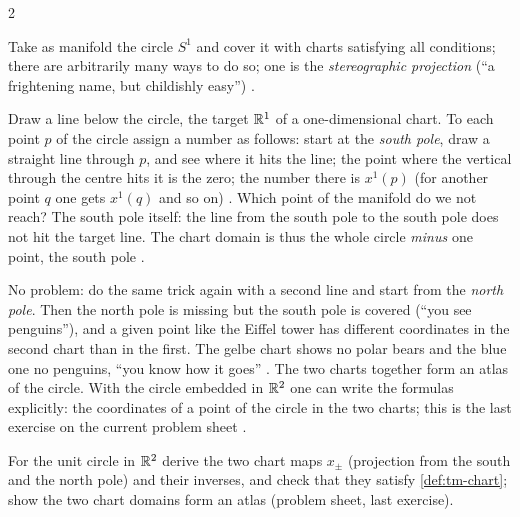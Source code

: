 \begin{paracol}{2}
\begin{example}\label{ex:tm-circle}
Take as manifold the circle $S^1$ and cover it with charts satisfying all conditions; there are arbitrarily many ways to
do so; one is the \emph{stereographic projection} (``a frightening name, but childishly easy'')
.\par
Draw a line below the circle, the target $\mathbb{R}^1$ of a one-dimensional chart. To each point $p$ of the circle assign
a number as follows: start at the \emph{south pole}, draw a straight line through $p$, and see where it hits the line; the
point where the vertical through the centre hits it is the zero; the number there is $x^1(p)$ (for another point $q$ one
gets $x^1(q)$ and so on) .
Which point of the manifold do we not reach? The south pole itself: the line from the south pole to the south pole does
not hit the target line. The chart domain is thus the whole circle \emph{minus} one point, the south pole
.\par
No problem: do the same trick again with a second line and start from the \emph{north pole}. Then the north pole is
missing but the south pole is covered (``you see penguins''), and a given point like the Eiffel tower has different
coordinates in the second chart than in the first. The gelbe chart shows no polar bears and the blue one no penguins,
``you know how it goes'' . The two charts together
form an atlas of the circle. With the circle embedded in $\mathbb{R}^2$ one can write the formulas explicitly: the coordinates of
a point of the circle in the two charts; this is the last exercise on the current problem sheet
.
\end{example}
\begin{exercise}\label{ex:tm-stereo}
For the unit circle in $\mathbb{R}^2$ derive the two chart maps $x_{\pm}$ (projection from the south and the north pole) and
their inverses, and check that they satisfy \cref{def:tm-chart}; show the two chart domains form an atlas
(problem sheet, last exercise).
\end{exercise}


\end{paracol}
